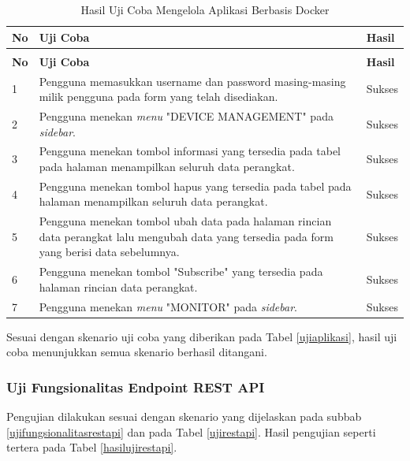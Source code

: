         \begin{longtable}{|p{}|p{}|p{}|}					\caption{Hasil Uji Coba Mengelola Aplikasi Berbasis Docker} \label{hasilujicobaaplikasi} \\
					\hline
					\textbf{No} & \textbf{Uji Coba} & \textbf{Hasil} \\ \hline
					\endfirsthead
					\caption[]{Hasil Uji Coba Mengelola Aplikasi Berbasis Docker} \\
					\hline
					\textbf{No} & \textbf{Uji Coba} & \textbf{Hasil} \\ \hline
					\endhead
					\endfoot
					\endlastfoot
					
                    1 & Pengguna memasukkan username dan password masing-masing milik pengguna pada form yang telah disediakan. & Sukses \\ \hline
                    2 & Pengguna menekan \textit{menu} "DEVICE MANAGEMENT" pada \textit{sidebar}. & Sukses \\ \hline
                    3 & Pengguna menekan tombol informasi yang tersedia pada tabel pada halaman menampilkan seluruh data perangkat. & Sukses \\ \hline
                    4 & Pengguna menekan tombol hapus yang tersedia pada tabel pada halaman menampilkan seluruh data perangkat. & Sukses \\ \hline
					5 & Pengguna menekan tombol ubah data pada halaman rincian data perangkat lalu mengubah data yang tersedia pada form yang berisi data sebelumnya. & Sukses \\ \hline
                    6 & Pengguna menekan tombol "Subscribe" yang tersedia pada halaman rincian data perangkat. & Sukses \\ \hline
					7 & Pengguna menekan \textit{menu} "MONITOR" pada \textit{sidebar}. & Sukses \\ \hline
				\end{longtable}
    		Sesuai dengan skenario uji coba  yang diberikan pada Tabel \ref{ujiaplikasi}, hasil uji coba menunjukkan semua skenario berhasil ditangani.
        
    	\subsubsection{Uji Fungsionalitas Endpoint REST API}
        	Pengujian dilakukan sesuai dengan skenario yang dijelaskan pada subbab \ref{ujifungsionalitasrestapi} dan pada Tabel \ref{ujirestapi}. Hasil pengujian seperti tertera pada Tabel \ref{hasilujirestapi}.
        	
